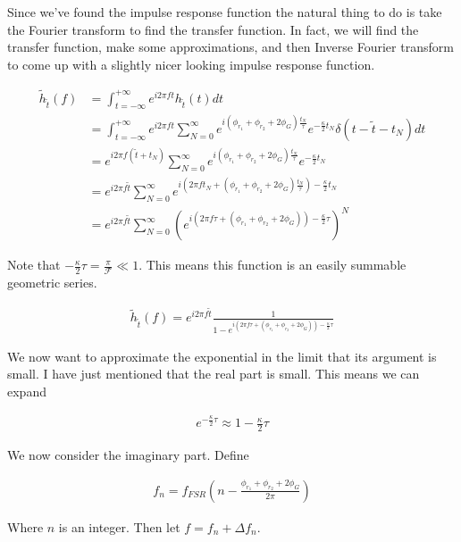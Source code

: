 \documentclass[12pt]{article}
\begin{document}
Since we've found the impulse response function the natural thing to do is take the Fourier transform to find the transfer function. In fact, we will find the transfer function, make some approximations, and then Inverse Fourier transform to come up with a slightly nicer looking impulse response function.

\begin{align}
\tilde{h}_{\tilde{t}}(f) &= \int_{t=-\infty}^{+\infty} e^{i 2\pi f t} h_{\tilde{t}}(t) dt\\
&= \int_{t=-\infty}^{+\infty} e^{i 2\pi f t}\sum_{N=0}^{\infty} e^{i(\phi_{r_1}+\phi_{r_2} + 2\phi_G) \frac{t_N}{\tau}}e^{-\frac{\kappa}{2}t_N}\delta(t-\tilde{t}-t_N) dt\\
&= e^{i 2 \pi f(\tilde{t}+t_N)} \sum_{N=0}^{\infty} e^{i(\phi_{r_1}+\phi_{r_2} + 2\phi_G) \frac{t_N}{\tau}}e^{-\frac{\kappa}{2}t_N}\\
&= e^{i 2\pi f \tilde{t}}\sum_{N=0}^{\infty} e^{i\left(2\pi f t_N + (\phi_{r_1} + \phi_{r_2} + 2\phi_G)\frac{t_N}{\tau}\right) -\frac{\kappa}{2} t_N}\\
&= e^{i 2\pi f \tilde{t}} \sum_{N=0}^{\infty} \left(e^{i\left(2\pi f \tau + (\phi_{r_1} + \phi_{r_2} + 2\phi_G)\right) - \frac{\kappa}{2}\tau}\right)^N
\end{align}

Note that $-\frac{\kappa}{2}\tau = \frac{\pi}{\mathcal{F}} \ll 1$. This means this function is an easily summable geometric series.

\begin{align}
\tilde{h}_{\tilde{t}}(f) = e^{i 2\pi f \tilde{t}} \frac{1}{1-e^{i\left(2\pi f \tau + (\phi_{r_1} + \phi_{r_2} + 2\phi_G)\right) - \frac{\kappa}{2}\tau}}
\end{align}

We now want to approximate the exponential in the limit that its argument is small. I have just mentioned that the real part is small. This means we can expand

\begin{align}
e^{- \frac{\kappa}{2} \tau} \approx 1 - \frac{\kappa}{2} \tau
\end{align}



We now consider the imaginary part. Define

\begin{align}
f_n = f_{FSR} \left(n-\frac{\phi_{r_1}+\phi_{r_2}+2\phi_G}{2\pi}\right)
\end{align}

Where $n$ is an integer.
Then let $f = f_n + \Delta f_n$.
\end{document}

